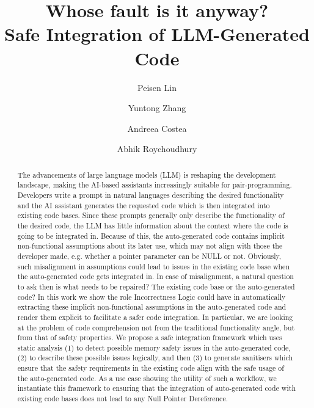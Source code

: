 \documentclass[acmsmall,nonacm,review,anonymous]{acmart}
\begin{document}
\title{Whose fault is it anyway? \\Safe Integration of LLM-Generated Code}
\author{Peisen Lin}
\author{Yuntong Zhang}
\author{Andreea Costea}
\author{Abhik Roychoudhury}

\renewcommand{\shortauthors}{XXX}

\begin{abstract}
The advancements of large language models (LLM) is reshaping the development landscape, making the AI-based assistants increasingly suitable for pair-programming. 
%
Developers write a prompt in natural languages describing the desired functionality and the AI assistant generates the requested code which is then integrated into existing code bases. 
%
Since these prompts generally only describe the functionality of the desired code, the LLM has little information about the context where the code is going to be integrated in. 
%
Because of this, the auto-generated code contains implicit non-functional assumptions about its later use, which may not align with those the developer made, e.g. whether a pointer parameter can be NULL or not. 
%
Obviously, such misalignment in assumptions could lead to issues in the existing code base when the auto-generated code gets integrated in.
%
In case of misalignment, a natural question to ask then is what needs to be repaired? The existing code base or the auto-generated code?
%
In this work we show the role Incorrectness Logic could have in automatically extracting these implicit non-functional assumptions in the auto-generated code and render them explicit to facilitate a safer code integration.
%
In particular, we are looking at the problem of code comprehension not from the traditional functionality angle, but from that of safety properties. 
%
We propose a safe integration framework which uses static analysis (1) to detect possible memory safety issues in the auto-generated code, (2) to describe these possible issues logically, and then (3) to generate sanitisers which ensure that the safety requirements in the existing code align with the safe usage of the auto-generated code.
% 
As a use case showing the utility of such a workflow, we instantiate this framework to ensuring that the integration of auto-generated code with existing code bases does not lead to any Null Pointer Dereference. 
\end{abstract}
\end{document}
